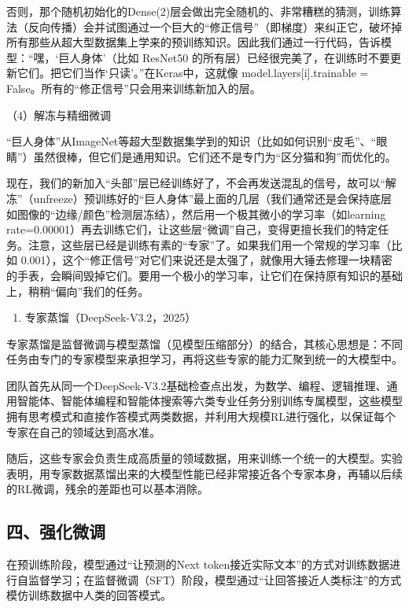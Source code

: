 否则，那个随机初始化的Dense(2)层会做出完全随机的、非常糟糕的猜测，训练算法（反向传播）会并试图通过一个巨大的``修正信号''（即梯度）来纠正它，破坏掉所有那些从超大型数据集上学来的预训练知识。因此我们通过一行代码，告诉模型：``嘿，`巨人身体'（比如 ResNet50 的所有层）已经很完美了，在训练时不要更新它们。把它们当作`只读'。''在Keras中，这就像 model.layers{[}i{]}.trainable = False。所有的``修正信号''只会用来训练新加入的层。

（4）解冻与精细微调

``巨人身体''从ImageNet等超大型数据集学到的知识（比如如何识别``皮毛''、``眼睛''）虽然很棒，但它们是通用知识。它们还不是专门为``区分猫和狗''而优化的。

现在，我们的新加入``头部''层已经训练好了，不会再发送混乱的信号，故可以``解冻''（unfreeze）预训练好的``巨人身体''最上面的几层（我们通常还是会保持底层如图像的``边缘/颜色''检测层冻结），然后用一个极其微小的学习率（如learning rate=0.00001）再去训练它们，让这些层``微调''自己，变得更擅长我们的特定任务。注意，这些层已经是训练有素的``专家''了。如果我们用一个常规的学习率（比如 0.001），这个``修正信号''对它们来说还是太强了，就像用大锤去修理一块精密的手表，会瞬间毁掉它们。要用一个极小的学习率，让它们在保持原有知识的基础上，稍稍``偏向''我们的任务。

\begin{enumerate}
\def\labelenumi{\arabic{enumi}.}
\setcounter{enumi}{2}
\tightlist
\item
  专家蒸馏（DeepSeek-V3.2，2025）
\end{enumerate}

专家蒸馏是监督微调与模型蒸馏（见模型压缩部分）的结合，其核心思想是：不同任务由专门的专家模型来承担学习，再将这些专家的能力汇聚到统一的大模型中。

团队首先从同一个DeepSeek-V3.2基础检查点出发，为数学、编程、逻辑推理、通用智能体、智能体编程和智能体搜索等六类专业任务分别训练专属模型，这些模型拥有思考模式和直接作答模式两类数据，并利用大规模RL进行强化，以保证每个专家在自己的领域达到高水准。

随后，这些专家会负责生成高质量的领域数据，用来训练一个统一的大模型。实验表明，用专家数据蒸馏出来的大模型性能已经非常接近各个专家本身，再辅以后续的RL微调，残余的差距也可以基本消除。

\hypertarget{ux56dbux5f3aux5316ux5faeux8c03}{%
\subsection{四、强化微调}\label{ux56dbux5f3aux5316ux5faeux8c03}}

在预训练阶段，模型通过``让预测的Next token接近实际文本''的方式对训练数据进行自监督学习；在监督微调（SFT）阶段，模型通过``让回答接近人类标注''的方式模仿训练数据中人类的回答模式。

